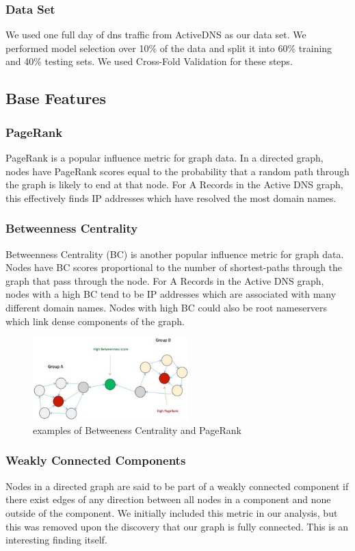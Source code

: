 \documentclass{acm_proc_article-sp}
\begin{document}
\subsubsection{Data Set}
We used one full day of dns traffic from ActiveDNS as our data set. We performed model selection over 10\% of the data and split it into 60\% training and 40\% testing sets. We used Cross-Fold Validation for these steps.


\subsection{Base Features}
\subsubsection{PageRank}
PageRank is a popular influence metric for graph data. In a directed graph, nodes have PageRank scores equal to the probability that a random path through the graph is likely to end at that node. For A Records in the Active DNS graph, this effectively finds IP addresses which have resolved the most domain names.

\subsubsection{Betweenness Centrality}
Betweenness Centrality (BC) is another popular influence metric for graph data. Nodes have BC scores proportional to the number of shortest-paths through the graph that pass through the node. For A Records in the Active DNS graph, nodes with a high BC tend to be IP addresses which are associated with many different domain names. Nodes with high BC could also be root nameservers which link dense components of the graph.

\begin{figure}[ht!]
\centering
\includegraphics[width=60mm]{images/Pagerank_BC.png}
\caption{examples of Betweeness Centrality and PageRank \label{overflow}}
\end{figure}

\subsubsection{Weakly Connected Components}
Nodes in a directed graph are said to be part of a weakly connected component if there exist edges of any direction between all nodes in a component and none outside of the component. We initially included this metric in our analysis, but this was removed upon the discovery that our graph is fully connected. This is an interesting finding itself.
\end{document}
